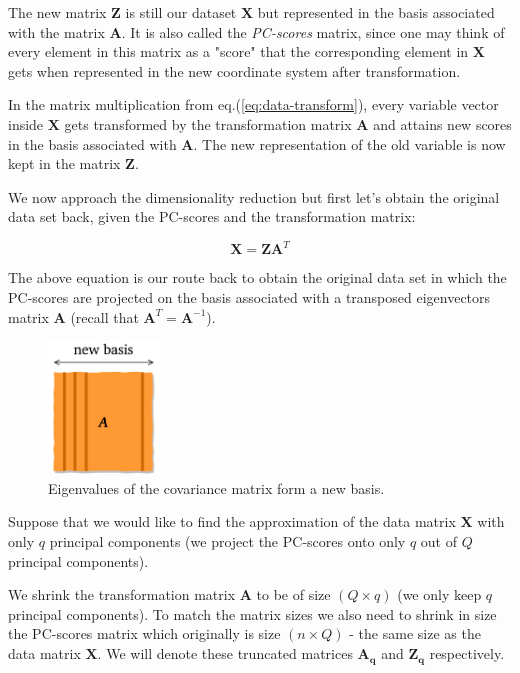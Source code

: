 \documentclass[10pt,twocolumn]{article}
\begin{document}
The new matrix $\bm{Z}$ is still our dataset $\bm{X}$ but represented in the basis associated with the matrix $\bm{A}$. It is also called the \textit{PC-scores} matrix, since one may think of every element in this matrix as a "score" that the corresponding element in $\bm{X}$ gets when represented in the new coordinate system after transformation.




In the matrix multiplication from eq.(\ref{eq:data-transform}), every variable vector inside $\bm{X}$ gets transformed by the transformation matrix $\bm{A}$ and attains new scores in the basis associated with $\bm{A}$. The new representation of the old variable is now kept in the matrix $\bm{Z}$.



We now approach the dimensionality reduction but first let's obtain the original data set back, given the PC-scores and the transformation matrix:

\begin{equation} \label{eq:X-retrieval}
\bm{X} = \bm{Z} \bm{A}^T
\end{equation}

The above equation is our route back to obtain the original data set in which the PC-scores are projected on the basis associated with a transposed eigenvectors matrix $\bm{A}$ (recall that $\bm{A}^T = \bm{A}^{-1}$).

\begin{figure}
\centering\includegraphics[width=3cm]{new-basis.png}
\caption{Eigenvalues of the covariance matrix form a new basis.}
\label{fig:new-basis}
\end{figure}

Suppose that we would like to find the approximation of the data matrix $\bm{X}$ with only $q$ principal components (we project the PC-scores onto only $q$ out of $Q$ principal components).

We shrink the transformation matrix $\bm{A}$ to be of size $(Q \times q)$ (we only keep $q$ principal components). To match the matrix sizes we also need to shrink in size the PC-scores matrix which originally is size $(n \times Q)$ - the same size as the data matrix $\bm{X}$. We will denote these truncated matrices $\bm{A_q}$ and $\bm{Z_q}$ respectively.
\end{document}
